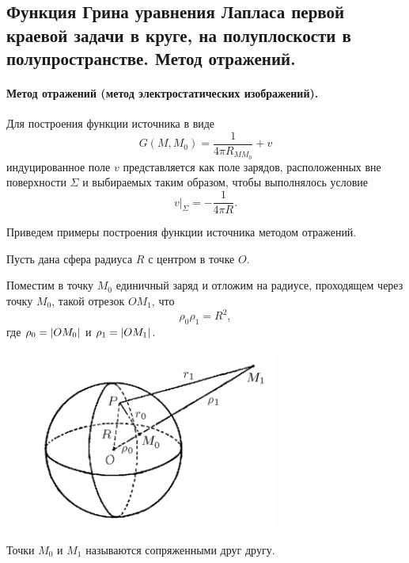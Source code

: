 \subsection{Функция Грина уравнения Лапласа первой краевой задачи в круге, на полуплоскости в полупространстве. Метод отражений.}

\paragraph{Метод отражений (метод электростатических изображений).}

Для построения функции источника в виде
\begin{equation*}
	G(M, M_0) = \frac{1}{4 \pi R_{M M_0}} + v
\end{equation*}
индуцированное поле $v$ представляется как поле зарядов, расположенных вне поверхности $\Sigma$ и выбираемых таким образом, чтобы выполнялось условие
\begin{equation*}
	v|_{\Sigma} = -\frac{1}{4 \pi R}.
\end{equation*}

Приведем примеры построения функции источника методом отражений.

Пусть дана сфера радиуса $R$ с центром в точке $O$.

Поместим в точку $M_0$ единичный заряд и отложим на радиусе, проходящем через точку $M_0$, такой отрезок $OM_1$, что
\begin{equation} \label{section}
	\rho_0 \rho_1 = R^2,
\end{equation}
где $\rho_0 = \abs{OM_0}$ и $\rho_1 = \abs{OM_1}$. 

\begin{figure}[H]
	\centering
	\includegraphics[width=0.4\linewidth]{img/sphere_green}
	\caption{}
\end{figure}

Точки $M_0$ и $M_1$ называются сопряженными друг другу. 

